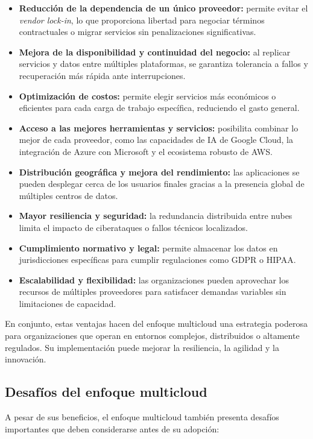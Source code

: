 {            \begin{itemize}
                \item \textbf{Reducción de la dependencia de un único proveedor:} permite evitar el \textit{vendor lock-in}, lo que proporciona libertad para negociar términos contractuales o migrar servicios sin penalizaciones significativas.
                \item \textbf{Mejora de la disponibilidad y continuidad del negocio:} al replicar servicios y datos entre múltiples plataformas, se garantiza tolerancia a fallos y recuperación más rápida ante interrupciones.
                \item \textbf{Optimización de costos:} permite elegir servicios más económicos o eficientes para cada carga de trabajo específica, reduciendo el gasto general.
                \item \textbf{Acceso a las mejores herramientas y servicios:} posibilita combinar lo mejor de cada proveedor, como las capacidades de IA de Google Cloud, la integración de Azure con Microsoft y el ecosistema robusto de AWS.
                \item \textbf{Distribución geográfica y mejora del rendimiento:} las aplicaciones se pueden desplegar cerca de los usuarios finales gracias a la presencia global de múltiples centros de datos.
                \item \textbf{Mayor resiliencia y seguridad:} la redundancia distribuida entre nubes limita el impacto de ciberataques o fallos técnicos localizados.
                \item \textbf{Cumplimiento normativo y legal:} permite almacenar los datos en jurisdicciones específicas para cumplir regulaciones como GDPR o HIPAA.
                \item \textbf{Escalabilidad y flexibilidad:} las organizaciones pueden aprovechar los recursos de múltiples proveedores para satisfacer demandas variables sin limitaciones de capacidad.
            \end{itemize}
            
            En conjunto, estas ventajas hacen del enfoque multicloud una estrategia poderosa para organizaciones que operan en entornos complejos, distribuidos o altamente regulados. Su implementación puede mejorar la resiliencia, la agilidad y la innovación.
            
        \subsection{Desafíos del enfoque multicloud}
            A pesar de sus beneficios, el enfoque multicloud también presenta desafíos importantes que deben considerarse antes de su adopción:
            
}

